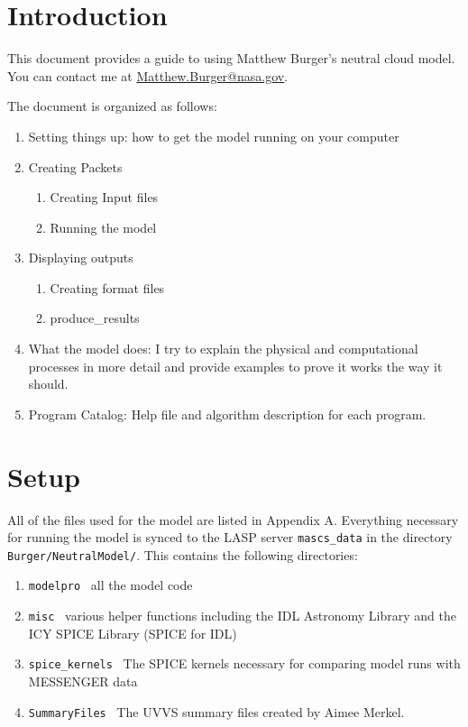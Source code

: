 \documentclass[11pt]{article}
\begin{document}
\tableofcontents

\section{Introduction}

This document provides a guide to using Matthew Burger's neutral cloud model.
You can contact me at 
\href{mailto:Matthew.Burger@nasa.gov}{Matthew.Burger@nasa.gov}. 

The document is organized as follows:
\begin{enumerate}
\item Setting things up: how to get the model running on your computer
\item Creating Packets
  \begin{enumerate}
  \item Creating Input files
  \item Running the model
  \end{enumerate}
\item Displaying outputs
  \begin{enumerate}
  \item Creating format files
  \item produce\_results
  \end{enumerate}
\item What the model does: I try to explain the physical and computational 
processes in more detail and provide examples to prove it works the way it 
should.
\item Program Catalog: Help file and algorithm description for each program.
\end{enumerate}

\section{Setup}

All of the files used for the model are listed in Appendix A. Everything
necessary for running the model is synced to the LASP server
\texttt{mascs\_data} in the directory \texttt{Burger/NeutralModel/}. This
contains the following directories:
\begin{enumerate}
\item \texttt{modelpro} \rarrow\ all the model code
\item \texttt{misc} \rarrow\ various helper functions including the IDL
Astronomy Library and the ICY SPICE Library (SPICE for IDL)
\item \texttt{spice\_kernels} \rarrow\ The SPICE kernels necessary for
comparing model runs with MESSENGER data
\item \texttt{SummaryFiles} \rarrow\ The UVVS summary files created by Aimee
Merkel.
\end{enumerate}
\end{document}
